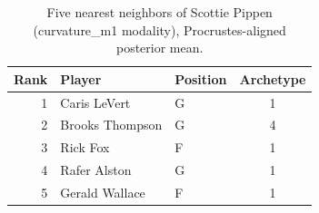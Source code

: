 \begin{table}[htbp]
  \centering\small
  \begin{tabular}{rllc}
    \toprule
    Rank & Player & Position & Archetype \\
    \midrule
    1 & Caris LeVert & G & 1 \\
    2 & Brooks Thompson & G & 4 \\
    3 & Rick Fox & F & 1 \\
    4 & Rafer Alston & G & 1 \\
    5 & Gerald Wallace & F & 1 \\
    \bottomrule
  \end{tabular}
  \caption{Five nearest neighbors of Scottie Pippen (curvature_m1 modality), Procrustes-aligned posterior mean.}
  \label{tab:Scottie_Pippen_neighbors_curvature_m1}
\end{table}

